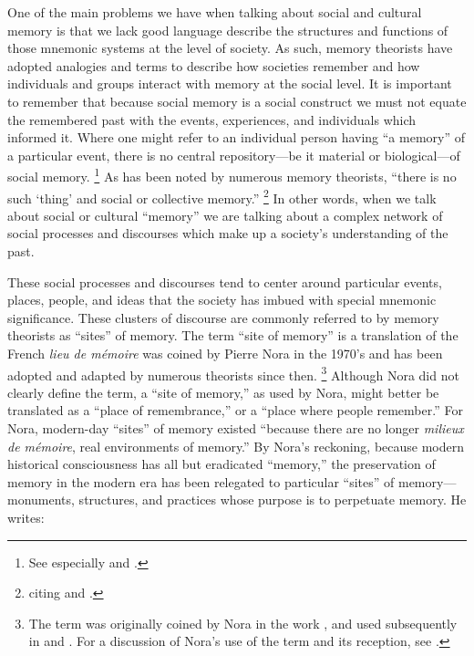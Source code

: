One of the main problems we have when talking about social and cultural memory is that we lack good language describe the structures and functions of those mnemonic systems at the level of society. As such, memory theorists have adopted analogies and terms to describe how societies remember and how individuals and groups interact with memory at the social level. It is important to remember that because social memory is a social construct we must not equate the remembered past with the events, experiences, and individuals which informed it. Where one might refer to an individual person having ``a memory'' of a particular event, there is no central repository---be it material or biological---of social memory.%
    \footnote{%
        See especially 
        \cite{brockmeier_cp2010} and 
        \cite{wertsch_cp2011}.}  
As has been noted by numerous memory theorists, ``there is no such `thing' and social or collective memory.''%
    \footnote{%
        \Cite[14]{wilson2017} citing 
        \cite[112]{olick-robbins_ars1998} and 
        \cite[118--24]{wertsch_boyer-wertsch2009}.}
In other words, when we talk about social or cultural ``memory'' we are talking about a complex network of social processes and discourses which make up a society's understanding of the past.

These social processes and discourses tend to center around particular events, places, people, and ideas that the society has imbued with special mnemonic significance. These clusters of discourse are commonly referred to by memory theorists as ``sites'' of memory. The term ``site of memory'' is a translation of the French \emph{lieu de mémoire} was coined by Pierre Nora in the 1970's and has been adopted and adapted by numerous theorists since then.%
    \footnote{%
        The term was originally coined by Nora in the work
        \cite*{nora_goff-etal1978}, and used subsequently in 
        \cite*{nora1984} and 
        \cite*{nora_representations1989}. For a discussion of Nora's use of the term and its reception, see 
        \cite{szpociński_teksty-drugie2016}.}
Although Nora did not clearly define the term, a ``site of memory,'' as used by Nora, might better be translated as a ``place of remembrance,'' or a ``place where people remember.'' For Nora, modern-day ``sites'' of memory existed ``because there are no longer \emph{milieux de mémoire}, real environments of memory.''%
    \autocite[7]{nora_representations1989}
By Nora's reckoning, because modern historical consciousness has all but eradicated ``memory,'' the preservation of memory in the modern era has been relegated to particular ``sites'' of memory---monuments, structures, and practices whose purpose is to perpetuate memory. He writes:

